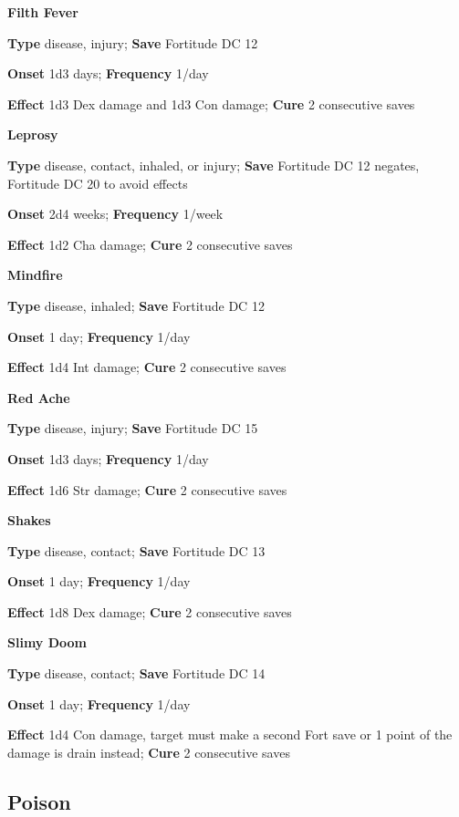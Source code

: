 \textbf{Filth Fever }
				
\textbf{Type} disease, injury; \textbf{Save} Fortitude DC 12 
				
\textbf{Onset }1d3 days; \textbf{Frequency} 1/day
				
\textbf{Effect }1d3 Dex damage and 1d3 Con damage;\textbf{ Cure} 2 consecutive saves
				
\textbf{Leprosy}
				
\textbf{Type} disease, contact, inhaled, or injury; \textbf{Save} Fortitude DC 12 negates, Fortitude DC 20 to avoid effects
				
\textbf{Onset }2d4 weeks; \textbf{Frequency} 1/week
				
\textbf{Effect }1d2 Cha damage;\textbf{ Cure} 2 consecutive saves
				
\textbf{Mindfire }
				
\textbf{Type} disease, inhaled; \textbf{Save} Fortitude DC 12 
				
\textbf{Onset }1 day; \textbf{Frequency} 1/day
				
\textbf{Effect }1d4 Int damage;\textbf{ Cure} 2 consecutive saves
				
\textbf{Red Ache }
				
\textbf{Type} disease, injury; \textbf{Save} Fortitude DC 15 
				
\textbf{Onset }1d3 days; \textbf{Frequency} 1/day
				
\textbf{Effect }1d6 Str damage;\textbf{ Cure} 2 consecutive saves
				
\textbf{Shakes }
				
\textbf{Type} disease, contact; \textbf{Save} Fortitude DC 13 
				
\textbf{Onset }1 day; \textbf{Frequency} 1/day
				
\textbf{Effect }1d8 Dex damage;\textbf{ Cure} 2 consecutive saves
				
\textbf{Slimy Doom }
				
\textbf{Type} disease, contact; \textbf{Save} Fortitude DC 14 
				
\textbf{Onset }1 day; \textbf{Frequency} 1/day
				
\textbf{Effect }1d4 Con damage, target must make a second Fort save or 1 point of the damage is drain instead;\textbf{ Cure} 2 consecutive saves
				
\subsection{Poison}

